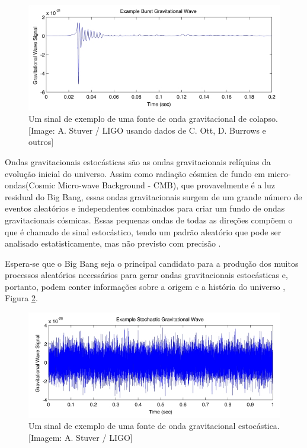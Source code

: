 \begin{figure}[ht]
\centering
\includegraphics[width=.9\textwidth]{figuras/burst_tn.jpg}
\caption{Um sinal de exemplo de uma fonte de onda gravitacional de colapso. [Image: A. Stuver / LIGO usando dados de C. Ott, D. Burrows e outros]}
\label{figondacolapso}
\end{figure}

Ondas gravitacionais estocásticas são as ondas gravitacionais relíquias da evolução inicial do universo. Assim como radiação cósmica de fundo em micro-ondas(Cosmic Micro-wave Background - CMB), que provavelmente é a luz residual do Big Bang, essas ondas gravitacionais surgem de um grande número de eventos aleatórios e independentes combinados para criar um fundo de ondas gravitacionais cósmicas. Essas pequenas ondas de todas as direções compõem o que é chamado de sinal estocástico, tendo um padrão aleatório que pode ser analisado estatisticamente, mas não previsto com precisão \cite{Christensen_2018}.

Espera-se que o Big Bang seja o principal candidato para a produção dos muitos processos aleatórios necessários para gerar ondas gravitacionais estocásticas e, portanto, podem conter informações sobre a origem e a história do universo \cite{Christensen_2018}, Figura \ref{figondaestocastica}.

\begin{figure}[ht]
\centering
\includegraphics[width=.9\textwidth]{figuras/stochastic_tn.jpg}
\caption{Um sinal de exemplo de uma fonte de onda gravitacional estocástica. [Imagem: A. Stuver / LIGO]}
\label{figondaestocastica}
\end{figure}

